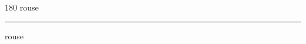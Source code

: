 
\begin{frame}
\begin{center}
\begin{turn}{180}
{\fontsize{2.5cm}{1em}\selectfont rouse}
\end{turn}
\vspace{1em}\par  
\hrule
\vspace{1em}\par  
{\fontsize{2.5cm}{1em}\selectfont rouse}
\end{center}
\end{frame}
